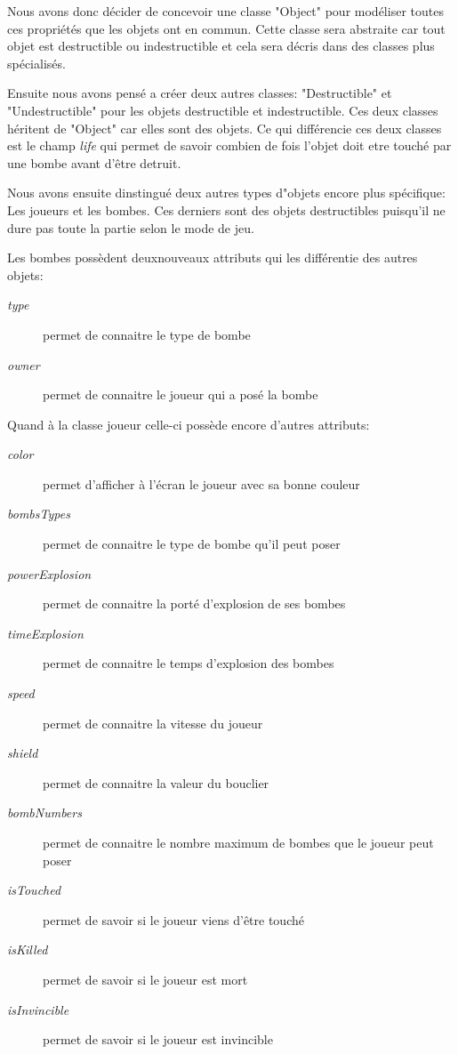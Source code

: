 	Nous avons donc décider de concevoir une classe "Object"  pour modéliser toutes ces propriétés que les objets ont en commun. Cette classe sera abstraite car tout objet est destructible ou indestructible et cela sera décris dans des classes plus spécialisés.
	
	 Ensuite nous avons pensé a créer deux autres classes: "Destructible" et "Undestructible" pour les objets destructible et indestructible. Ces deux classes héritent de "Object" car elles sont des objets. Ce qui différencie ces deux classes est le champ \textit{life} qui permet de savoir combien de fois l'objet doit etre touché par une bombe avant d'être detruit.
	
	Nous avons ensuite dinstingué deux autres types d"objets encore plus spécifique: Les joueurs et les bombes. Ces derniers sont des objets destructibles puisqu'il ne dure pas toute la partie selon le mode de jeu.
	
	Les bombes possèdent deuxnouveaux attributs qui les différentie des autres objets: 
	\begin{description}
		\item [\textit{type}]{permet de connaitre le type de bombe}
		\item [\textit{owner}]{permet de connaitre le joueur qui a posé la bombe}
	\end{description}
	
	Quand à la classe joueur celle-ci possède encore d'autres attributs: 
	\begin{description}
		\item [\textit{color}]{permet d'afficher à l'écran le joueur avec sa bonne couleur}
		\item [\textit{bombsTypes}]{permet de connaitre le type de bombe qu'il peut poser}
		\item [\textit{powerExplosion}]{permet de connaitre la porté d'explosion de ses bombes}
		\item [\textit{timeExplosion}]{permet de connaitre le temps d'explosion des bombes}
		\item [\textit{speed}]{permet de connaitre la vitesse du joueur}
		\item [\textit{shield}]{permet de connaitre la valeur du bouclier}
		\item [\textit{bombNumbers}]{permet de connaitre le nombre maximum de bombes que le joueur peut poser}
		\item [\textit{isTouched}]{permet de savoir si le joueur viens d'être touché}
		\item [\textit{isKilled}]{permet de savoir si le joueur est mort}
		\item [\textit{isInvincible}]{permet de savoir si le joueur est invincible}
	\end{description}
	
